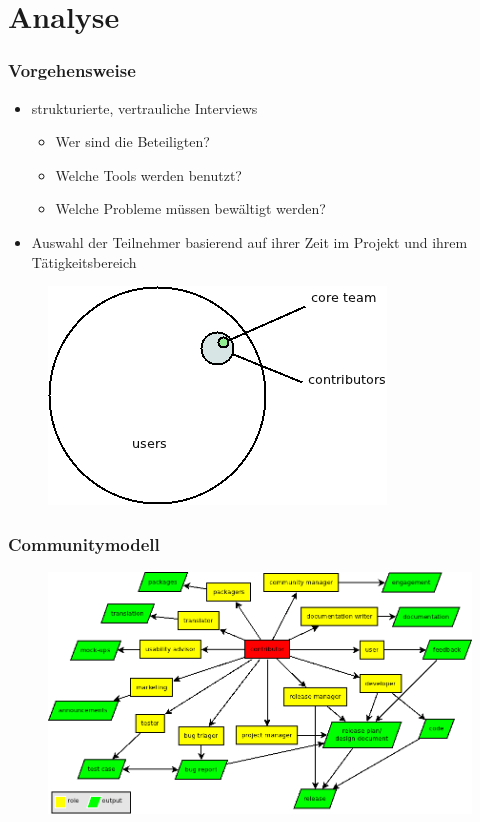 \documentclass{beamer}
\begin{document}
\section{Analyse}

\begin{frame}
\frametitle{Vorgehensweise}
\begin{itemize}
 \item strukturierte, vertrauliche Interviews
     \begin{itemize}
        \item Wer sind die Beteiligten?
        \item Welche Tools werden benutzt?
        \item Welche Probleme m\"ussen bew\"altigt werden?
     \end{itemize}
 \item Auswahl der Teilnehmer basierend auf ihrer Zeit im Projekt und ihrem T\"atigkeitsbereich
\end{itemize}
\begin{figure}[h!]
 \centering
 \includegraphics[scale=0.35,keepaspectratio=true]{./communitymodel.png}
\end{figure}
\end{frame}

\begin{frame}
\frametitle{Communitymodell}
\begin{figure}[h!]
 \centering
 \includegraphics[scale=0.35,keepaspectratio=true]{./ontology.png}
\end{figure}
\end{frame}
\end{document}
